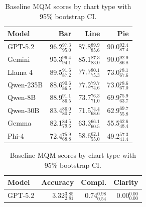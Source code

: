 \begin{table}[h]
\centering
\begin{minipage}[t]{0.48\textwidth}
\centering
\small
\begin{tabular}{@{}lrrr@{}}
\toprule
\textbf{Model} & \textbf{Bar} & \textbf{Line} & \textbf{Pie} \\
\midrule
GPT-5.2 & 96.2$_{\scriptstyle 95.0}^{\scriptstyle 97.3}$ & 87.8$_{\scriptstyle 85.6}^{\scriptstyle 89.9}$ & 90.0$_{\scriptstyle 87.4}^{\scriptstyle 92.4}$ \\
Gemini & 95.3$_{\scriptstyle 94.1}^{\scriptstyle 96.4}$ & 85.1$_{\scriptstyle 83.0}^{\scriptstyle 87.3}$ & 90.0$_{\scriptstyle 86.8}^{\scriptstyle 92.9}$ \\
Llama 4 & 89.5$_{\scriptstyle 87.2}^{\scriptstyle 91.6}$ & 77.7$_{\scriptstyle 75.3}^{\scriptstyle 80.1}$ & 73.0$_{\scriptstyle 67.6}^{\scriptstyle 78.1}$ \\
Qwen-235B & 88.6$_{\scriptstyle 86.5}^{\scriptstyle 90.6}$ & 77.2$_{\scriptstyle 74.6}^{\scriptstyle 79.7}$ & 73.0$_{\scriptstyle 67.0}^{\scriptstyle 78.6}$ \\
Qwen-8B & 88.9$_{\scriptstyle 86.5}^{\scriptstyle 91.1}$ & 73.7$_{\scriptstyle 71.0}^{\scriptstyle 76.3}$ & 69.9$_{\scriptstyle 63.7}^{\scriptstyle 75.9}$ \\
Qwen-30B & 83.4$_{\scriptstyle 80.7}^{\scriptstyle 86.0}$ & 71.5$_{\scriptstyle 68.6}^{\scriptstyle 74.4}$ & 62.9$_{\scriptstyle 55.8}^{\scriptstyle 69.7}$ \\
Gemma & 82.1$_{\scriptstyle 79.6}^{\scriptstyle 84.5}$ & 63.3$_{\scriptstyle 60.5}^{\scriptstyle 66.1}$ & 55.5$_{\scriptstyle 48.4}^{\scriptstyle 62.6}$ \\
Phi-4 & 72.4$_{\scriptstyle 68.8}^{\scriptstyle 75.9}$ & 58.6$_{\scriptstyle 55.0}^{\scriptstyle 62.1}$ & 49.2$_{\scriptstyle 41.4}^{\scriptstyle 57.3}$ \\
\bottomrule
\end{tabular}
\caption{Baseline MQM scores by chart type with 95\% bootstrap CI.}
\label{tab:mqm-chart-type}
\end{minipage}\hfill
\begin{minipage}[t]{0.48\textwidth}
\centering
\small
\begin{tabular}{@{}lrrr@{}}
\toprule
\textbf{Model} & \textbf{Accuracy} & \textbf{Compl.} & \textbf{Clarity} \\
\midrule
GPT-5.2 & 3.32$_{\scriptstyle 2.81}^{\scriptstyle 3.85}$ & 0.74$_{\scriptstyle 0.54}^{\scriptstyle 0.98}$ & 0.00$_{\scriptstyle 0.00}^{\scriptstyle 0.00}$ \\

\end{tabular}
\end{minipage}
\end{table}
